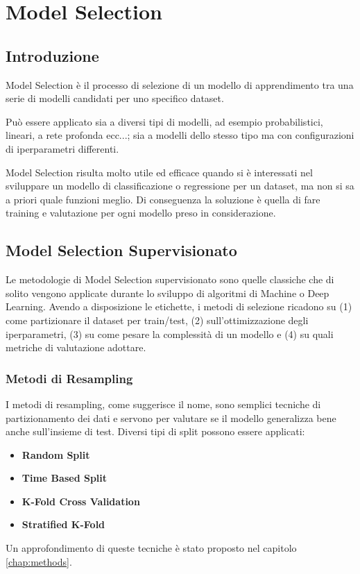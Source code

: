 \chapter{Model Selection}
\label{chap:modelselection}

\section{Introduzione}
Model Selection è il processo di selezione di un modello di apprendimento tra una serie di modelli candidati per uno specifico dataset.

Può essere applicato sia a diversi tipi di modelli, ad esempio probabilistici, lineari, a rete profonda ecc...; sia a modelli dello stesso tipo ma con configurazioni di iperparametri differenti.

Model Selection risulta molto utile ed efficace quando si è interessati nel sviluppare un modello di classificazione o regressione per un dataset, ma non si sa a priori quale funzioni meglio. Di conseguenza la soluzione è quella di fare training e valutazione per ogni modello preso in considerazione.

\section{Model Selection Supervisionato}
Le metodologie di Model Selection supervisionato sono quelle classiche che di solito vengono applicate durante lo sviluppo di algoritmi di Machine o Deep Learning. Avendo a disposizione le etichette, i metodi di selezione ricadono su (1) come partizionare il dataset per train/test, (2) sull'ottimizzazione degli iperparametri, (3) su come pesare la complessità di un modello e (4) su quali metriche di valutazione adottare.

\subsection{Metodi di Resampling}
I metodi di resampling, come suggerisce il nome, sono semplici tecniche di partizionamento dei dati e servono per valutare se il modello generalizza bene anche sull'insieme di test. Diversi tipi di split possono essere applicati:
\begin{itemize}
	\item \textbf{Random Split}
	\item \textbf{Time Based Split} 
	\item \textbf{K-Fold Cross Validation}
	\item \textbf{Stratified K-Fold}
\end{itemize}
Un approfondimento di queste tecniche è stato proposto nel capitolo \ref{chap:methods}.

